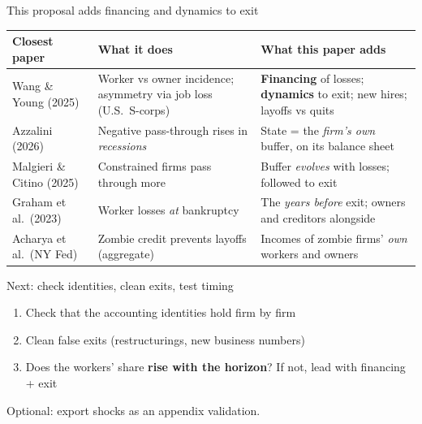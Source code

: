 \documentclass[aspectratio=169,11pt]{beamer}
\newlength{\safezone}
\newcommand{\hl}[1]{{\color{WarmAmber}\bfseries #1}}
\newcommand{\muted}[1]{{\color{CoolGray}#1}}
\begin{document}
\begin{frame}[label=contrib]{This proposal adds financing and dynamics to exit}
  \footnotesize
  \renewcommand{\arraystretch}{1.15}
  \begin{tabularx}{\textwidth}{>{\raggedright\arraybackslash}p{3.0cm} >{\raggedright\arraybackslash}X >{\raggedright\arraybackslash}X}
    \toprule
    \textbf{Closest paper} & \textbf{What it does} & \textbf{\color{SlateTeal}What this paper adds} \\
    \midrule
    Wang \& Young (2025) & Worker vs owner incidence; asymmetry via job loss (U.S.\ S-corps) & \hl{Financing} of losses; \hl{dynamics} to exit; new hires; layoffs vs quits \\
    Azzalini (2026) & Negative pass-through rises in \emph{recessions} & State = the \emph{firm's own} buffer, on its balance sheet \\
    Malgieri \& Citino (2025) & Constrained firms pass through more & Buffer \emph{evolves} with losses; followed to exit \\
    Graham et al.\ (2023) & Worker losses \emph{at} bankruptcy & The \emph{years before} exit; owners and creditors alongside \\
    Acharya et al.\ (NY Fed) & Zombie credit prevents layoffs (aggregate) & Incomes of zombie firms' \emph{own} workers and owners \\
    \bottomrule
  \end{tabularx}
  \vfill
  \hfill \hyperlink{closing}{}\hspace{\safezone}
\end{frame}

\begin{frame}[label=nextsteps]{Next: check identities, clean exits, test timing}
  \begin{enumerate}
    \item Check that the accounting identities hold firm by firm
    \item Clean false exits (restructurings, new business numbers)
    \item Does the workers' share \hl{rise with the horizon}? If not, lead with financing + exit
  \end{enumerate}
  \vspace{8pt}
  \muted{Optional: export shocks as an appendix validation.}
  \vfill
  \hfill \hyperlink{closing}{}\hspace{\safezone}
\end{frame}
\end{document}
